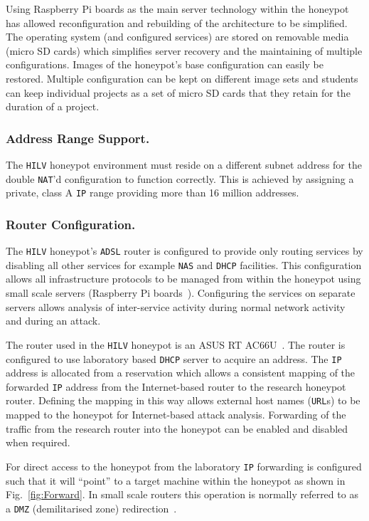 \documentclass{llncs}
\begin{document}
Using Raspberry Pi boards as the main server technology within the honeypot has
allowed reconfiguration and rebuilding of the architecture to be simplified.
The operating system (and configured services) are stored on removable media
(micro SD cards) which simplifies server recovery and the maintaining of
multiple configurations. Images of the honeypot's base configuration can easily
be restored. Multiple configuration can be kept on different image sets and
students can keep individual projects as a set of micro SD cards that they
retain for the duration of a project.

\subsubsection{Address Range Support.}

The \texttt{HILV} honeypot environment must reside on a different subnet
address for the double \texttt{NAT}'d configuration to function correctly. This
is achieved by assigning a private, class A \texttt{IP} range providing more
than 16 million addresses.

\subsubsection{Router Configuration.}

The \texttt{HILV} honeypot's \texttt{ADSL} router is configured to provide only
routing services by disabling all other services for example \texttt{NAS} and
\texttt{DHCP} facilities. This configuration allows all infrastructure
protocols to be managed from within the honeypot using small scale servers
(Raspberry Pi boards~\cite{RASP:17}). Configuring the services on separate
servers allows analysis of inter-service activity during normal network
activity and during an attack.

The router used in the \texttt{HILV} honeypot is an ASUS RT
AC66U~\cite{ASUS:17}. The router is configured to use laboratory based
\texttt{DHCP} server to acquire an  address. The \texttt{IP} address is
allocated from a reservation which allows a consistent mapping of the forwarded
\texttt{IP} address from the Internet-based router to the research honeypot
router. Defining the mapping in this way allows external host names
(\texttt{URL}s) to be mapped to the honeypot for Internet-based attack
analysis. Forwarding of the traffic from the research router into the honeypot
can be enabled and disabled when required.

For direct access to the honeypot from the laboratory \texttt{IP} forwarding is
configured such that it will ``point'' to a target machine within the honeypot
as shown in Fig.~\ref{fig:Forward}. In small scale routers this operation is
normally referred to as a \texttt{DMZ} (demilitarised zone)
redirection~\cite{DK:08,MB:01}.
\end{document}

